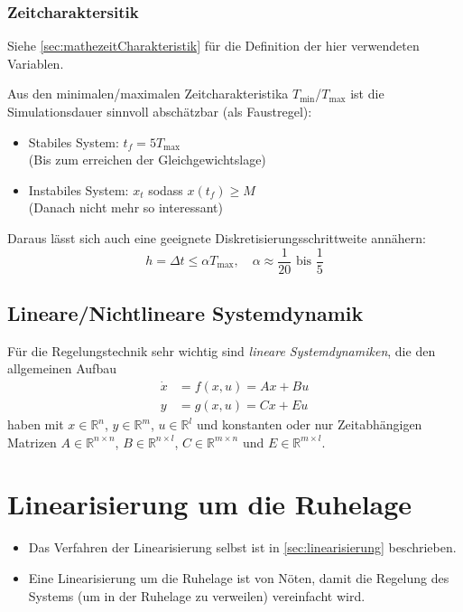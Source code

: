 \documentclass[a4paper, 11pt, accentcolor = tud3b]{tudreport}
\begin{document}
                \subsubsection{Zeitcharaktersitik} %
	                Siehe \ref{sec:mathezeitCharakteristik} für die Definition der hier verwendeten Variablen.
                
	                Aus den minimalen/maximalen Zeitcharakteristika \( T _ {\min} \)/\( T _ {\max} \) ist die Simulationsdauer sinnvoll abschätzbar (als Faustregel):
	                \begin{itemize}
	                	\item Stabiles System: \( t _ f = 5 T _ {\max} \) \\ (Bis zum erreichen der Gleichgewichtslage)
	                	\item Instabiles System: \(x_t\) sodass \( x(t _ f) \geq M \) \\ (Danach nicht mehr so interessant)
	                \end{itemize}
	                Daraus lässt sich auch eine geeignete Diskretisierungsschrittweite annähern:
	                \begin{equation*}
		                h = \Delta t \leq \alpha T _ {\max}, \quad \alpha \approx \frac{1}{20} \text{ bis } \frac{1}{5}
	                \end{equation*}

            \subsection{Lineare/Nichtlineare Systemdynamik} %
                Für die Regelungstechnik sehr wichtig sind \textit{lineare Systemdynamiken}, die den allgemeinen Aufbau
                \begin{align*}
	                \dot{x} &= f(x, u) = Ax + Bu \\
	                y       &= g(x, u) = Cx + Eu
                \end{align*}
                haben mit \( x \in \mathbb{R} ^ n \), \( y \in \mathbb{R} ^ m \), \( u \in \mathbb{R} ^ l \) und konstanten oder nur Zeitabhängigen Matrizen \( A \in \mathbb{R} ^ { n \times n } \), \( B \in \mathbb{R} ^ { n \times l } \), \( C \in \mathbb{R} ^ { m \times n } \) und \( E \in \mathbb{R} ^ { m \times l } \).

        \section{Linearisierung um die Ruhelage} %
	        \begin{itemize}
	        	\item Das Verfahren der Linearisierung selbst ist in \ref{sec:linearisierung} beschrieben.
	        	\item Eine Linearisierung um die Ruhelage ist von Nöten, damit die Regelung des Systems (um in der Ruhelage zu verweilen) vereinfacht wird.
	        \end{itemize}
\end{document}
